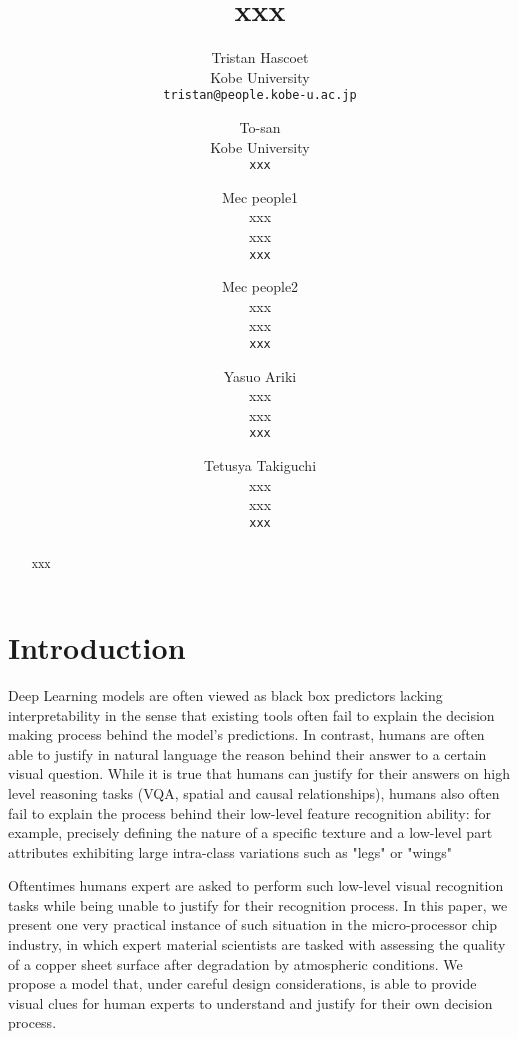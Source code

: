 \documentclass[10pt,twocolumn,letterpaper]{article}
\begin{document}
\title{xxx}

\author{
Tristan Hascoet\\
Kobe University\\
{\tt\small tristan@people.kobe-u.ac.jp}
\and
To-san\\
Kobe University\\
{\tt\small xxx}
\and
Mec people1\\
xxx\\
xxx\\
{\tt\small xxx}
\and
Mec people2\\
xxx\\
xxx\\
{\tt\small xxx}
\and
Yasuo Ariki\\
xxx\\
xxx\\
{\tt\small xxx}
\and
Tetusya Takiguchi\\
xxx\\
xxx\\
{\tt\small xxx}
}

\maketitle


\begin{abstract}
xxx
\end{abstract}

\section{Introduction}

Deep Learning models are often viewed as black box predictors lacking interpretability 
in the sense that existing tools often fail to explain the decision making process behind the model’s predictions.
In contrast, humans are often able to justify in natural language the reason behind their answer to a certain visual question.
While it is true that humans can justify for their answers on high level reasoning tasks (VQA, spatial and causal relationships), 
humans also often fail to explain the process behind their low-level feature recognition ability:
for example, precisely defining the nature of a specific texture and a low-level part attributes exhibiting large intra-class variations such as "legs" or "wings"

% 
Oftentimes humans expert are asked to perform such low-level visual 
recognition tasks while being unable to justify for their recognition process.
In this paper, we present one very practical instance of such situation in the micro-processor chip industry, 
in which expert material scientists are tasked with assessing the quality of a copper sheet 
surface after degradation by atmospheric conditions.
We propose a model that, under careful design considerations, is able to provide visual clues 
for human experts to understand and justify for their own decision process.
\end{document}
